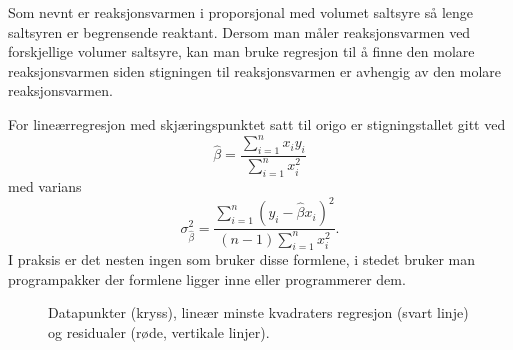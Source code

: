 	Som nevnt er reaksjonsvarmen i  proporsjonal med volumet saltsyre så lenge saltsyren er begrensende reaktant.
	Dersom man måler reaksjonsvarmen ved forskjellige volumer saltsyre, kan man bruke regresjon til å finne den molare reaksjonsvarmen siden stigningen til reaksjonsvarmen er avhengig av den molare reaksjonsvarmen.
	
	For lineærregresjon med skjæringspunktet satt til origo er stigningstallet gitt ved
	\begin{equation}
		\hat{\beta} = \frac{\sum_{i=1}^nx_iy_i}{\sum_{i=1}^nx_i^2}
	\end{equation}
	med varians
	\begin{equation}
		\sigma_{\hat{\beta}}^2 = \frac{\sum_{i=1}^{n}(y_i-\hat{\beta}x_i)^2}{(n-1)\sum_{i=1}^nx_i^2}.
	\end{equation}
	I praksis er det nesten ingen som bruker disse formlene, i stedet bruker man programpakker der formlene ligger inne eller programmerer dem.
	
	\begin{figure}[H]
		\centering
		
		\loadedtable
		
		
		
		\caption{Datapunkter (kryss), lineær minste kvadraters regresjon (svart linje) og residualer (røde, vertikale linjer).}
		\label{fig:lsr}
	\end{figure}

